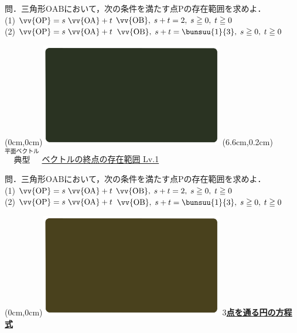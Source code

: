 \documentclass[10pt,
fleqn,
dvipdfmx,
uplatex
]{jsarticle}
\begin{document}
\normalsize 
問．三角形$\text{OAB}$において，次の条件を満たす点$\text{P}$の存在範囲を求めよ．\\
(1) $\vv{\text{OP}} =s$$\vv{\text{OA}} +t$$\vv{\text{OB}} ,\;s+t=2,\;s\geqq 0,\;t\geqq 0$\\
(2) $\vv{\text{OP}} =s$$\vv{\text{OA}} +t$$\vv{\text{OB}} ,\;s+t=\bunsuu{1}{3},\;s\geqq 0,\;t\geqq 0$\\



\newpage



\at(0cm,0cm){\includegraphics[width=8cm,bb=0 0 1920 1080]{./youtube/thumbnails/templates/smart_background/平面ベクトル.jpeg}}
\at(6.6cm,0.2cm){\small\color{bradorange}$\overset{\text{平面ベクトル}}{\text{典型}}$}
{\color{orange}\large\underline{ベクトルの終点の存在範囲 Lv.1 }}\vspace{0.3zw}

\normalsize 
問．三角形$\text{OAB}$において，次の条件を満たす点$\text{P}$の存在範囲を求めよ．\\
(1) $\vv{\text{OP}} =s$$\vv{\text{OA}} +t$$\vv{\text{OB}} ,\;s+t=2,\;s\geqq 0,\;t\geqq 0$\\
(2) $\vv{\text{OP}} =s$$\vv{\text{OA}} +t$$\vv{\text{OB}} ,\;s+t=\bunsuu{1}{3},\;s\geqq 0,\;t\geqq 0$\\



\newpage

\at(0cm,0cm){\includegraphics[width=8cm,bb=0 0 1920 1080]{./youtube/thumbnails/templates/smart_background/図形と方程式.jpeg}}
{\color{orange}\bf\boldmath\LARGE\underline{$3$点を通る円の方程式}}\vspace{0.3zw}
\end{document}
